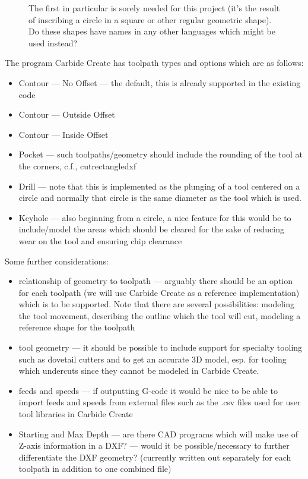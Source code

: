 \documentclass{ltxdoc}
\begin{document}
\begin{figure}
 The first in particular is sorely needed for this project
 (it’s the result of inscribing a circle in a square or
 other regular geometric shape). Do these shapes
 have names in any other languages which might be
 used instead?
\end{figure}

The program Carbide Create has toolpath types and options which are as follows:

\begin{itemize}
 \item Contour --- No Offset --- the default, this is already supported in the existing code
 \item Contour --- Outside Offset
 \item Contour --- Inside Offset
 \item Pocket --- such toolpaths/geometry should include the rounding of the tool 
       at the corners, c.f., cutrectangledxf
 \item Drill --- note that this is implemented as the plunging of a tool centered on a circle
                 and normally that circle is the same diameter as the tool which is used.
 \item Keyhole --- also beginning from a circle, a nice feature for this would be to 
                   include/model the areas which should be cleared for the sake of reducing wear
                   on the tool and ensuring chip clearance
\end{itemize}

 
Some further considerations:

\begin{itemize}
 \item relationship of geometry to toolpath --- arguably there should be an option for each
       toolpath (we will use Carbide Create as a reference implementation) which is to be 
       supported. Note that there are several possibilities: modeling the tool movement,
       describing the outline which the tool will cut, modeling a reference shape for the toolpath
 \item tool geometry --- it should be possible to include support for specialty tooling 
       such as dovetail cutters and to get an accurate 3D model, esp. for tooling which
       undercuts since they cannot be modeled in Carbide Create.
 \item feeds and speeds --- if outputting G-code it would be nice to be able to import feeds 
       and speeds from external files such as the .csv files used for user tool libraries in
       Carbide Create
 \item Starting and Max Depth --- are there CAD programs which will make use of Z-axis information 
       in a DXF? --- would it be possible/necessary to further differentiate the DXF geometry?
       (currently  written out separately for each toolpath in addition to one combined file)
\end{itemize}
\end{document}
